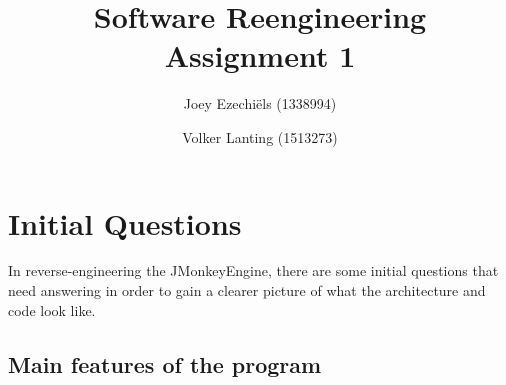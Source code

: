 \documentclass[a4paper, 10pt]{article}
\title{Software Reengineering\\
       Assignment 1}
\author{Joey Ezechi\"{e}ls (1338994) \and Volker Lanting (1513273)}
\begin{document}
\maketitle %

\newpage
\tableofcontents %


\newpage
{}
\section{Initial Questions}
\label{sec:initial_question}
In reverse-engineering the JMonkeyEngine, there are some initial
questions that need answering in order to gain a clearer picture
of what the architecture and code look like.



\subsection{Main features of the program}
\label{sec:main_features}
\end{document}
